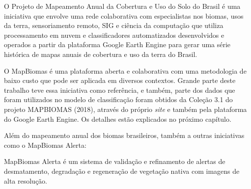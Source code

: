 \begin{citacao}
O Projeto de Mapeamento Anual da Cobertura e Uso do Solo do Brasil é uma
iniciativa que envolve uma rede colaborativa com especialistas nos
biomas, usos da terra, sensoriamento remoto, SIG e ciência da computação
que utiliza processamento em nuvem e classificadores automatizados
desenvolvidos e operados a partir da plataforma Google Earth Engine para
gerar uma série histórica de mapas anuais de cobertura e uso da terra do
Brasil. \cite{mapbiomas2018coleccao}
\end{citacao} 

O MapBiomas é uma plataforma aberta e colaborativa com uma metodologia
de baixo custo que pode ser aplicada em diversos contextos. Grande parte
deste trabalho teve essa iniciativa como referência, e também, parte dos
dados que foram utilizados no modelo de classificação foram obtidos da
Coleção 3.1 do projeto MAPBIOMAS (2018), através do próprio \emph{site} e também pela
plataforma do Google Earth Engine. Os detalhes estão explicados no próximo capítulo.

Além do mapeamento anual dos biomas brasileiros, também a outras
iniciativas como o MapBiomas Alerta:

\begin{citacao}
MapBiomas Alerta é um sistema de validação e refinamento de alertas de
desmatamento, degradação e regeneração de vegetação nativa com imagens
de alta resolução. \cite{mapbiomas2018coleccao}
\end{citacao}







